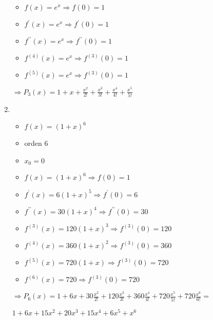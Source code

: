 \documentclass[../practica_05.tex]{subfiles}
\begin{document}
\begin{enumerate}
            \begin{itemize}
                \item $f(x) = e^x \Rightarrow f(0) = 1$
                \item $f^\prime(x) = e^x \Rightarrow f^\prime(0) = 1$
                \item $f^{\prime\prime}(x) = e^x \Rightarrow f^{\prime\prime}(0) = 1$
                \item $f^{(4)}(x) = e^x \Rightarrow f^{(3)}(0) = 1$
                \item $f^{(5)}(x) = e^x \Rightarrow f^{(3)}(0) = 1$
            \end{itemize}

            $\Rightarrow P_3(x) = 1 + x + \frac{x^2}{2!} + \frac{x^3}{3!} + \frac{x^4}{4!} + \frac{x^5}{5!}$

        \item
            \begin{itemize}
                \item $f(x) = (1+x)^6$
                \item orden 6
                \item $x_0 = 0$
            \end{itemize}

            \begin{itemize}
                \item $f(x) = (1+x)^6 \Rightarrow f(0) = 1$
                \item $f^\prime(x) = 6(1+x)^5 \Rightarrow f^\prime(0) = 6$
                \item $f^{\prime\prime}(x) = 30(1+x)^4 \Rightarrow f^{\prime\prime}(0) = 30$
                \item $f^{(3)}(x) = 120(1+x)^3 \Rightarrow f^{(3)}(0) = 120$
                \item $f^{(4)}(x) = 360(1+x)^2 \Rightarrow f^{(3)}(0) = 360$
                \item $f^{(5)}(x) = 720(1+x) \Rightarrow f^{(3)}(0) = 720$
                \item $f^{(6)}(x) = 720 \Rightarrow f^{(3)}(0) = 720$
            \end{itemize}

            $\Rightarrow P_6(x) = 1 + 6x + 30\frac{x^2}{2!} + 120\frac{x^3}{3!} + 360\frac{x^4}{4!} + 720\frac{x^5}{5!} + 720\frac{x^6}{6!} = $

            $1 + 6x + 15x^2 + 20x^3 + 15x^4 + 6x^5 + x^6$

    \end{enumerate}
\end{document}
